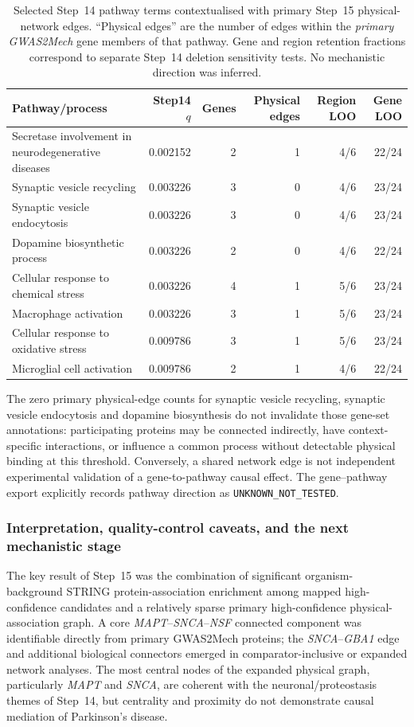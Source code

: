 \documentclass[11pt,a4paper]{article}
\begin{document}
\begin{table}[!htbp]
\centering\scriptsize
\caption{Selected Step~14 pathway terms contextualised with primary Step~15 physical-network edges. ``Physical edges'' are the number of edges within the \emph{primary GWAS2Mech} gene members of that pathway. Gene and region retention fractions correspond to separate Step~14 deletion sensitivity tests. No mechanistic direction was inferred.}
\label{tab:step15_pathway_network}
\begin{tabularx}{\linewidth}{@{}Xrrrrr@{}}
\toprule
Pathway/process & Step14 $q$ & Genes & Physical edges & Region LOO & Gene LOO \\\midrule
Secretase involvement in neurodegenerative diseases & 0.002152 & 2 & 1 & 4/6 & 22/24 \\
Synaptic vesicle recycling & 0.003226 & 3 & 0 & 4/6 & 23/24 \\
Synaptic vesicle endocytosis & 0.003226 & 3 & 0 & 4/6 & 23/24 \\
Dopamine biosynthetic process & 0.003226 & 2 & 0 & 4/6 & 22/24 \\
Cellular response to chemical stress & 0.003226 & 4 & 1 & 5/6 & 23/24 \\
Macrophage activation & 0.003226 & 3 & 1 & 5/6 & 23/24 \\
Cellular response to oxidative stress & 0.009786 & 3 & 1 & 5/6 & 23/24 \\
Microglial cell activation & 0.009786 & 2 & 1 & 4/6 & 22/24 \\
\bottomrule
\end{tabularx}
\end{table}

The zero primary physical-edge counts for synaptic vesicle recycling, synaptic vesicle endocytosis and dopamine biosynthesis do not invalidate those gene-set annotations: participating proteins may be connected indirectly, have context-specific interactions, or influence a common process without detectable physical binding at this threshold. Conversely, a shared network edge is not independent experimental validation of a gene-to-pathway causal effect. The gene--pathway export explicitly records pathway direction as \texttt{UNKNOWN\_NOT\_TESTED}.

\subsubsection{Interpretation, quality-control caveats, and the next mechanistic stage}
The key result of Step~15 was the combination of significant organism-background STRING protein-association enrichment among mapped high-confidence candidates and a relatively sparse primary high-confidence physical-association graph. A core \textit{MAPT}--\textit{SNCA}--\textit{NSF} connected component was identifiable directly from primary GWAS2Mech proteins; the \textit{SNCA}--\textit{GBA1} edge and additional biological connectors emerged in comparator-inclusive or expanded network analyses. The most central nodes of the expanded physical graph, particularly \textit{MAPT} and \textit{SNCA}, are coherent with the neuronal/proteostasis themes of Step~14, but centrality and proximity do not demonstrate causal mediation of Parkinson's disease.
\end{document}
